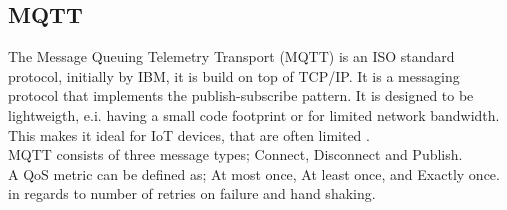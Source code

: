 \subsection{MQTT}
The Message Queuing Telemetry Transport (MQTT) is an ISO standard protocol, initially by IBM, it is build on top of TCP/IP. It is a messaging protocol that implements the publish-subscribe pattern\cite{}. It is designed to be lightweigth, e.i. having a small code footprint or for limited network bandwidth\cite{}. This makes it ideal for IoT devices, that are often limited .\\
MQTT consists of three message types; Connect, Disconnect and Publish.\\
A QoS metric can be defined as; At most once, At least once, and Exactly once. in regards to number of retries on failure and hand shaking.